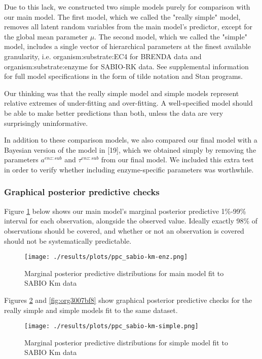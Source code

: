 \documentclass[11pt]{article}
\makeatletter
\newcommand{\citeprocitem}[2]{\hyper@linkstart{cite}{citeproc_bib_item_#1}#2\hyper@linkend}
\makeatother
\begin{document}
Due to this lack, we constructed two simple models purely for comparison with
our main model. The first model, which we called the "really simple" model,
removes all latent random variables from the main model's predictor, except for
the global mean parameter \(\mu\). The second model, which we called the "simple"
model, includes a single vector of hierarchical parameters at the finest
available granularity, i.e. organism:substrate:EC4 for BRENDA data and
organism:substrate:enzyme for SABIO-RK data. See supplemental information for
full model specifications in the form of tilde notation and Stan programs.

Our thinking was that the really simple model and simple models represent
relative extremes of under-fitting and over-fitting. A well-specified model
should be able to make better predictions than both, unless the data are very
surprisingly uninformative.

In addition to these comparison models, we also compared our final model with a
Bayesian version of the model in \citeprocitem{19}{[19]},
which we obtained simply by removing the parameters \(a^{enz:sub}\) and
\(\tau^{enz:sub}\) from our final model. We included this extra test in order to
verify whether including enzyme-specific parameters was worthwhile.

\subsubsection{Graphical posterior predictive checks}
\label{sec:org40de5a1}
Figure \ref{fig:org2dad7a6} below shows our main model's marginal posterior
predictive 1\%-99\% interval for each observation, alongside the observed
value. Ideally exactly 98\% of observations should be covered, and whether or not
an observation is covered should not be systematically predictable.

\begin{figure}[htbp]
\centering
\texttt{[image: ./results/plots/ppc\_sabio-km-enz.png]}
\caption{\label{fig:org2dad7a6}Marginal posterior predictive distributions for main model fit to SABIO Km data}
\end{figure}

Figures \ref{fig:org6b01034} and \ref{fig:org3007bf8} show
graphical posterior predictive checks for the really simple and simple models
fit to the same dataset.

\begin{figure}[htbp]
\centering
\texttt{[image: ./results/plots/ppc\_sabio-km-simple.png]}
\caption{\label{fig:org6b01034}Marginal posterior predictive distributions for simple model fit to SABIO Km data}
\end{figure}
\end{document}
